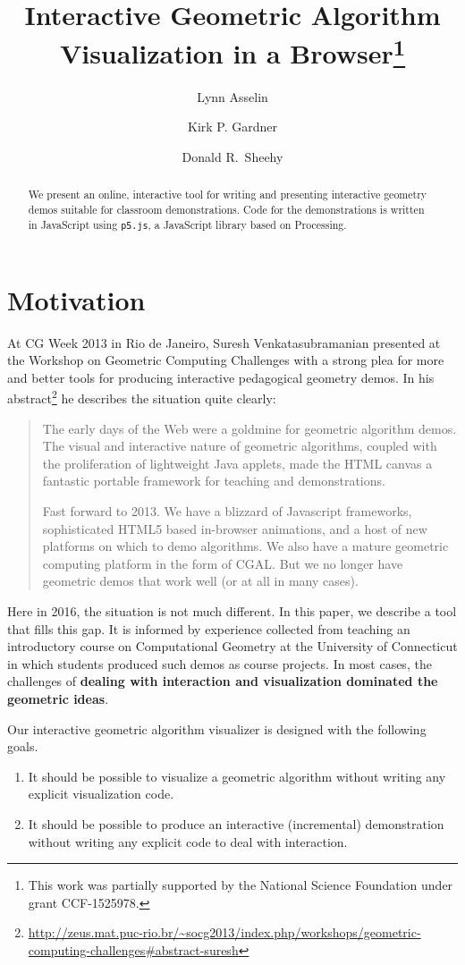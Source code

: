 \documentclass[a4paper,UKenglish]{lipics-v2016}
\title{Interactive Geometric Algorithm Visualization in a Browser\footnote{This work was partially supported by the National Science Foundation under grant CCF-1525978.}}
\author[1]{Lynn Asselin}
\author[2]{Kirk P. Gardner}
\author[3]{Donald R.~Sheehy}
\affil[1]{University of Connecticut\\
  \texttt{lynn.asselin@uconn.edu}}
\affil[2]{University of Connecticut\\
  \texttt{kirk.gardner@uconn.edu}}
\affil[3]{University of Connecticut\\
  \texttt{don.r.sheehy@gmail.com}}
\begin{document}
\maketitle

\begin{abstract}
  We present an online, interactive tool for writing and presenting interactive geometry demos suitable for classroom demonstrations.
  Code for the demonstrations is written in JavaScript using \texttt{p5.js}, a JavaScript library based on Processing.
\end{abstract}

\section{Motivation} %
\label{sec:motivation}

  At CG Week 2013 in Rio de Janeiro, Suresh Venkatasubramanian presented at the Workshop on Geometric Computing Challenges with a strong plea for more and better tools for producing interactive pedagogical geometry demos.  
  In his abstract\footnote{\url{http://zeus.mat.puc-rio.br/~socg2013/index.php/workshops/geometric-computing-challenges\#abstract-suresh}} he describes the situation quite clearly:
  \begin{quote}    
    The early days of the Web were a goldmine for geometric algorithm demos. The visual and interactive nature of geometric algorithms, coupled with the proliferation of lightweight Java applets, made the HTML canvas a fantastic portable framework for teaching and demonstrations.

    Fast forward to 2013. We have a blizzard of Javascript frameworks, sophisticated HTML5 based in-browser animations, and a host of new platforms on which to demo algorithms. We also have a mature geometric computing platform in the form of CGAL. But we no longer have geometric demos that work well (or at all in many cases).
  \end{quote}

  Here in 2016, the situation is not much different.
  In this paper, we describe a tool that fills this gap.
  It is informed by experience collected from teaching an introductory course on Computational Geometry at the University of Connecticut in which students produced such demos as course projects.
  In most cases, the challenges of \textbf{dealing with interaction and visualization dominated the geometric ideas}.

  \clearpage
  Our interactive geometric algorithm visualizer is designed with the following goals.
  \begin{enumerate}
    \item It should be possible to visualize a geometric algorithm without writing any explicit visualization code.  
    \item It should be possible to produce an interactive (incremental) demonstration without writing any explicit code to deal with interaction.  
  \end{enumerate}
  
\end{document}

